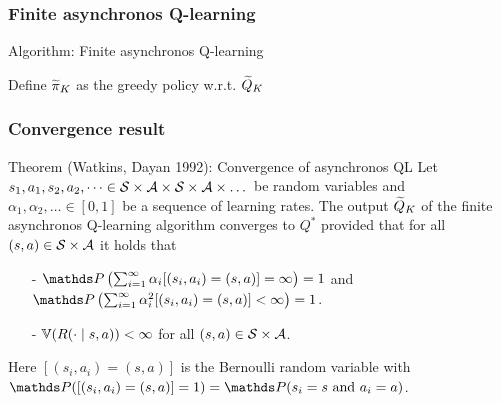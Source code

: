 \documentclass{beamer}[10]
\begin{document}
\begin{frame}
  \frametitle{Finite asynchronos Q-learning}
  \begingroup \footnotesize
  \begin{block}{Algorithm: Finite asynchronos Q-learning}
    \begin{algorithm}[H]

      Define $\widetilde{\pi}_K$ as the greedy policy w.r.t. $\widetilde{Q}_K$ \\
    \end{algorithm}
  \end{block}
  \endgroup
\end{frame}

\begin{frame}
  \frametitle{Convergence result}
  \begingroup \small
  \begin{block}{Theorem (Watkins, Dayan 1992): Convergence of asynchronos QL}
    Let $s_1, a_1, s_2, a_2, \dots \in
    \mathcal{S} \times \mathcal{A} \times \mathcal{S} \times \mathcal{A} \times \dots$
    be random variables and $\alpha_1, \alpha_2, \dots \in [0,1]$
    be a sequence of learning rates.
    The output $\widetilde{Q}_K$ of the finite asynchronos Q-learning algorithm
    converges to $Q^*$ provided that for all $(s, a) \in \mathcal{S} \times \mathcal{A}$
    it holds that
    \begin{itemize}
      \item[-] $\Prob\left(\sum_{i=1}^\infty \alpha_i
	[(s_i, a_i) = (s,a)] = \infty \right) = 1$
	and
	$\Prob\left(\sum_{i=1}^\infty \alpha_i^2
	[(s_i, a_i) = (s,a)] < \infty\right) = 1$.
      \item[-] $\mathbb{V}(R(\cdot \mid s, a)) < \infty$ for all $(s, a) \in
	\mathcal{S}\times\mathcal{A}$.
    \end{itemize}
    Here $[(s_i, a_i) = (s, a)]$ is the Bernoulli random variable with
    $\Prob([(s_i, a_i) = (s, a)] = 1) = \Prob(s_i = s \text{ and } a_i = a)$.
  \end{block}
  \endgroup
\end{frame}
\end{document}
